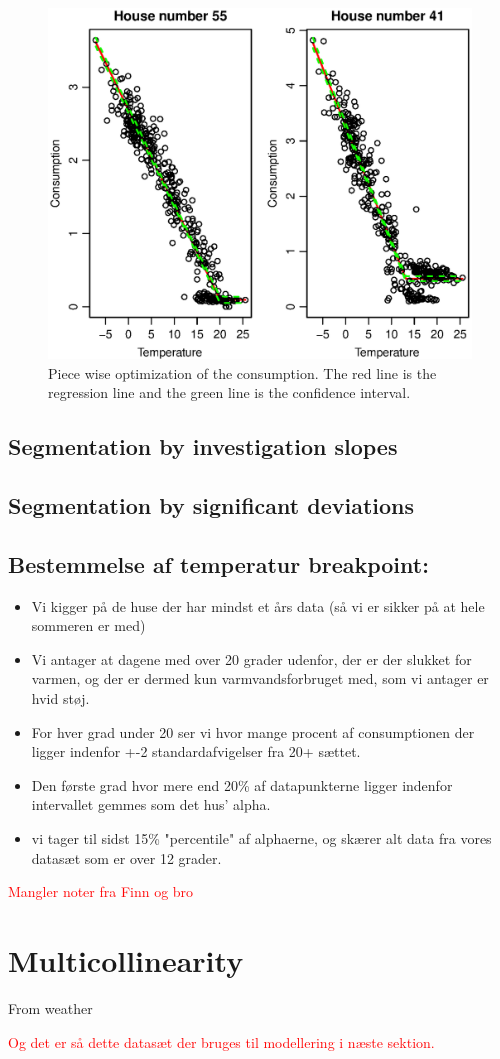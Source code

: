 \begin{figure}[H]
    \centering
    \includegraphics[width=\textwidth]{../../../figures/Consumption-PW.eps}
    \caption{Piece wise optimization of the consumption. The red line is the regression line and the green line is the confidence interval.}
    \label{fig: Consumption-PW}
\end{figure}
\subsection*{Segmentation by investigation slopes}

\subsection*{Segmentation by significant deviations}

\subsection*{Bestemmelse af temperatur breakpoint:}
\begin{itemize}
    \item Vi kigger på de huse der har mindst et års data (så vi er sikker på at hele sommeren er med)
    \item Vi antager at dagene med over 20 grader udenfor, der er der slukket for varmen, og der er dermed kun varmvandsforbruget med, som vi antager er hvid støj.
    \item For hver grad under 20 ser vi hvor mange procent af consumptionen der ligger indenfor +-2 standardafvigelser fra 20+ sættet.
    \item Den første grad hvor mere end 20\% af datapunkterne ligger indenfor intervallet gemmes som det hus' alpha.
    \item vi tager til sidst 15\% "percentile" af alphaerne, og skærer alt data fra vores datasæt som er over 12 grader.
\end{itemize}

\textcolor{red}{Mangler noter fra Finn og bro}


\section{Multicollinearity}
From weather



\textcolor{red}{Og det er så dette datasæt der bruges til modellering i næste sektion.}